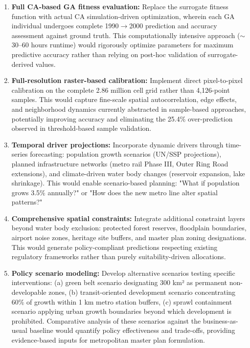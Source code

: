 \documentclass[conference]{IEEEtran}
\begin{document}
\begin{enumerate}
\item \textbf{Full CA-based GA fitness evaluation:} Replace the surrogate fitness function with actual CA simulation-driven optimization, wherein each GA individual undergoes complete 1990$\rightarrow$2000 prediction and accuracy assessment against ground truth. This computationally intensive approach ($\sim$30--60 hours runtime) would rigorously optimize parameters for maximum predictive accuracy rather than relying on post-hoc validation of surrogate-derived values.

\item \textbf{Full-resolution raster-based calibration:} Implement direct pixel-to-pixel calibration on the complete 2.86 million cell grid rather than 4,126-point samples. This would capture fine-scale spatial autocorrelation, edge effects, and neighborhood dynamics currently abstracted in sample-based approaches, potentially improving accuracy and eliminating the 25.4\% over-prediction observed in threshold-based sample validation.

\item \textbf{Temporal driver projections:} Incorporate dynamic drivers through time-series forecasting: population growth scenarios (UN/SSP projections), planned infrastructure networks (metro rail Phase III, Outer Ring Road extensions), and climate-driven water body changes (reservoir expansion, lake shrinkage). This would enable scenario-based planning: "What if population grows 3.5\% annually?" or "How does the new metro line alter spatial patterns?"

\item \textbf{Comprehensive spatial constraints:} Integrate additional constraint layers beyond water body exclusion: protected forest reserves, floodplain boundaries, airport noise zones, heritage site buffers, and master plan zoning designations. This would generate policy-compliant predictions respecting existing regulatory frameworks rather than purely suitability-driven allocations.

\item \textbf{Policy scenario modeling:} Develop alternative scenarios testing specific interventions: (a) green belt scenario designating 300 km² as permanent non-developable zones, (b) transit-oriented development scenario concentrating 60\% of growth within 1 km metro station buffers, (c) sprawl containment scenario applying urban growth boundaries beyond which development is prohibited. Comparative analysis of these scenarios against the business-as-usual baseline would quantify policy effectiveness and trade-offs, providing evidence-based inputs for metropolitan master plan formulation.
\end{enumerate}
\end{document}
